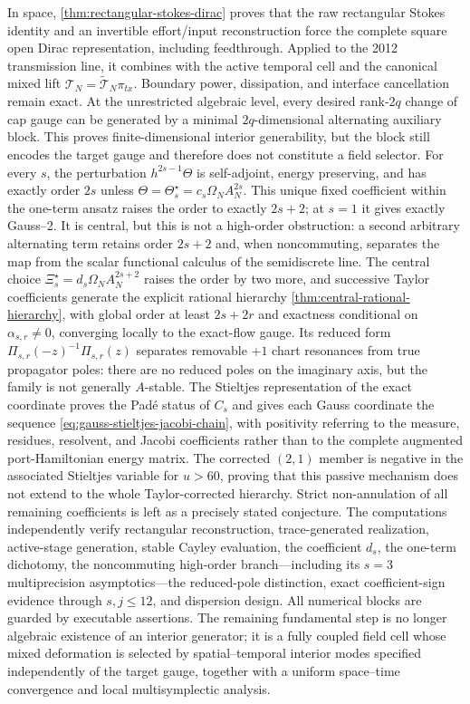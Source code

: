 \documentclass[11pt,a4paper]{article}
\begin{document}
In space, \cref{thm:rectangular-stokes-dirac} proves that the raw
rectangular Stokes identity and an invertible effort/input reconstruction
force the complete square open Dirac representation, including
feedthrough.  Applied to the 2012 transmission line, it combines with the
active temporal cell and the canonical mixed lift
\(\mathcal T_N=\widetilde{\mathcal T}_N\pi_{tx}\).  Boundary power,
dissipation, and interface cancellation remain exact.  At the
unrestricted algebraic level, every desired rank-\(2q\) change of cap
gauge can be generated by
a minimal \(2q\)-dimensional alternating auxiliary block.  This proves
finite-dimensional interior generability, but the block still encodes the
target gauge and therefore does not constitute a field selector.  For every \(s\),
the perturbation \(h^{2s-1}\Theta\) is self-adjoint, energy preserving,
and has exactly order \(2s\) unless
\(\Theta=\Theta_s^\star=c_s\Omega_NA_N^{2s}\).  This unique fixed
coefficient within the one-term ansatz raises the order to exactly
\(2s+2\); at \(s=1\) it gives exactly Gauss--2.  It is central, but this
is not a high-order obstruction: a second arbitrary alternating term
retains order \(2s+2\) and, when noncommuting, separates the map from the
scalar functional calculus of the semidiscrete line.  The central choice
\(\Xi_s^\star=d_s\Omega_NA_N^{2s+2}\) raises the order by two more, and
successive Taylor coefficients generate the explicit rational hierarchy
\cref{thm:central-rational-hierarchy}, with global order at least
\(2s+2r\) and exactness conditional on \(\alpha_{s,r}\ne0\), converging
locally to the exact-flow gauge.  Its reduced form
\(\Pi_{s,r}(-z)^{-1}\Pi_{s,r}(z)\) separates removable \(+1\) chart
resonances from true propagator poles: there are no reduced poles on the
imaginary axis, but the family is not generally \(A\)-stable.  The
Stieltjes representation of the exact coordinate proves the Pad\'e status
of \(C_s\) and gives each Gauss coordinate the sequence
\cref{eq:gauss-stieltjes-jacobi-chain}, with positivity referring to the
measure, residues, resolvent, and Jacobi coefficients rather than to the
complete augmented port-Hamiltonian energy matrix.  The corrected
\((2,1)\) member is negative in the associated
Stieltjes variable for \(u>60\), proving that this passive mechanism does
not extend to the whole Taylor-corrected hierarchy.  Strict non-annulation of all remaining coefficients is left as
a precisely stated conjecture.  The computations independently verify
rectangular reconstruction, trace-generated realization, active-stage
generation, stable Cayley evaluation, the coefficient \(d_s\), the
one-term dichotomy, the noncommuting high-order branch---including its
\(s=3\) multiprecision asymptotics---the reduced-pole distinction, exact
coefficient-sign evidence through \(s,j\le12\), and dispersion design.
All numerical blocks are guarded by executable assertions.  The remaining
fundamental step is no longer algebraic existence of an interior generator;
it is a fully coupled field cell whose mixed deformation is selected by
spatial--temporal interior modes specified independently of the target
gauge, together with a uniform
space--time convergence and local multisymplectic analysis.
\end{document}

